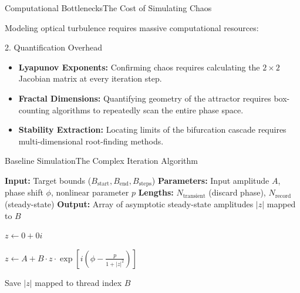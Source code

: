 \documentclass[aspectratio=169]{beamer}
\begin{document}
\begin{frame}[t]{Computational Bottlenecks}{The Cost of Simulating Chaos}
    
    Modeling optical turbulence requires massive computational resources:
    
    \begin{customblock}{2. Quantification Overhead}
        \begin{itemize}
            \item \textbf{Lyapunov Exponents:} Confirming chaos requires calculating the $2\times2$ Jacobian matrix at every iteration step.
            
            \item \textbf{Fractal Dimensions:} Quantifying geometry of the attractor requires box-counting algorithms to repeatedly scan the entire phase space.
            
            \item \textbf{Stability Extraction:} Locating limits of the bifurcation cascade requires multi-dimensional root-finding methods.
        \end{itemize}
    \end{customblock}
    
\end{frame}
\begin{frame}[fragile, c]{Baseline Simulation}{The Complex Iteration Algorithm}
    \vspace{-3em}
    \begin{algorithm}[H]
    \fontsize{8}{1.1}\selectfont
    \caption{Complex Ikeda Map Simulation}
    \begin{algorithmic}[1]
        \Require \textbf{Input:} Target bounds ($B_{\text{start}}, B_{\text{end}}, B_{\text{steps}}$)
        \Require \textbf{Parameters:} Input amplitude $A$, phase shift $\phi$, nonlinear parameter $p$
        \Require \textbf{Lengths:} $N_{\text{transient}}$ (discard phase), $N_{\text{record}}$ (steady-state)
        \Ensure \textbf{Output:} Array of asymptotic steady-state amplitudes $|z|$ mapped to $B$
        
        \vspace{0.1cm}
            \State $z \leftarrow 0 + 0i$ 
            
                \State $z \leftarrow A + B \cdot z \cdot \exp\left[i\left(\phi - \frac{p}{1 + |z|^2}\right)\right]$
                
                    \State Save $|z|$ mapped to thread index $B$
                \EndIf
            \EndFor
        \EndFor
    \end{algorithmic}
    \end{algorithm}
\end{frame}
\end{document}
